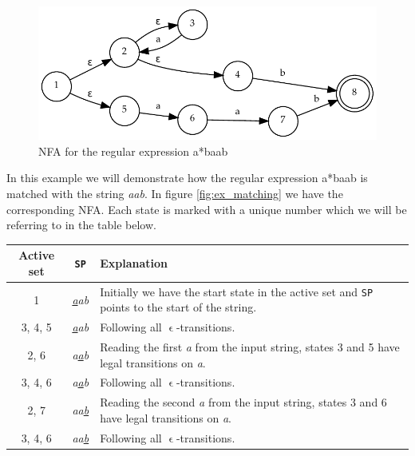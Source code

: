 \begin{example}
  \begin{figure}
    \centering
    \includegraphics[width=\textwidth]{matching/ex_matching.pdf}
    \caption{NFA for the regular expression \textsf{a*b\textbar aab}}
    \label{fig:ex_matching}
  \end{figure}
  
  In this example we will demonstrate how the regular expression
  \textsf{a*b\textbar aab} is matched with the string \textsl{aab}. In
  figure \vref{fig:ex_matching} we have the corresponding NFA. Each
  state is marked with a unique number which we will be referring to
  in the table below.

\begin{center}
\begin{tabular}{ccp{8.5cm}}
Active set & \texttt{SP} & Explanation \\
\hline

1 & \textsl{\underline{a}ab} & Initially we have the start state in
the active set and \texttt{SP} points to the start of the string. \\

3, 4, 5 & \textsl{\underline{a}ab} & Following all
$\upvarepsilon$-transitions. \\

2, 6 & \textsl{a\underline{a}b} & Reading the first \textsl{a} from the input
string, states 3 and 5 have legal transitions on \textsl{a}. \\

3, 4, 6 & \textsl{a\underline{a}b} & Following all
$\upvarepsilon$-transitions. \\

2, 7 & \textsl{aa\underline{b}} & Reading the second \textsl{a} from
the input string, states 3 and 6 have legal transitions on
\textsl{a}. \\

3, 4, 6 & \textsl{aa\underline{b}} & Following all
$\upvarepsilon$-transitions. \\


\end{tabular}
\end{center}
\end{example}
